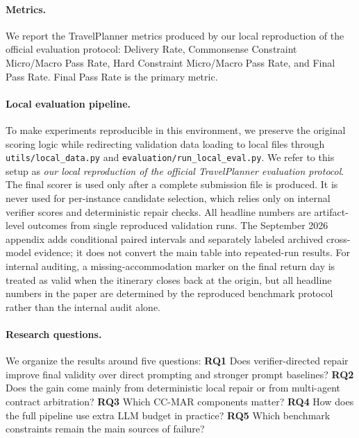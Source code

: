 \documentclass{article}
\begin{document}
\paragraph{Metrics.}
We report the TravelPlanner metrics produced by our local reproduction of the official evaluation protocol: Delivery Rate, Commonsense Constraint Micro/Macro Pass Rate, Hard Constraint Micro/Macro Pass Rate, and Final Pass Rate. Final Pass Rate is the primary metric.

\paragraph{Local evaluation pipeline.}
To make experiments reproducible in this environment, we preserve the original scoring logic while redirecting validation data loading to local files through \texttt{utils/local\_data.py} and \texttt{evaluation/run\_local\_eval.py}. We refer to this setup as \emph{our local reproduction of the official TravelPlanner evaluation protocol}. The final scorer is used only after a complete submission file is produced. It is never used for per-instance candidate selection, which relies only on internal verifier scores and deterministic repair checks. All headline numbers are artifact-level outcomes from single reproduced validation runs. The September 2026 appendix adds conditional paired intervals and separately labeled archived cross-model evidence; it does not convert the main table into repeated-run results. For internal auditing, a missing-accommodation marker on the final return day is treated as valid when the itinerary closes back at the origin, but all headline numbers in the paper are determined by the reproduced benchmark protocol rather than the internal audit alone.

\paragraph{Research questions.}
We organize the results around five questions: \textbf{RQ1} Does verifier-directed repair improve final validity over direct prompting and stronger prompt baselines? \textbf{RQ2} Does the gain come mainly from deterministic local repair or from multi-agent contract arbitration? \textbf{RQ3} Which CC-MAR components matter? \textbf{RQ4} How does the full pipeline use extra LLM budget in practice? \textbf{RQ5} Which benchmark constraints remain the main sources of failure?
\end{document}
